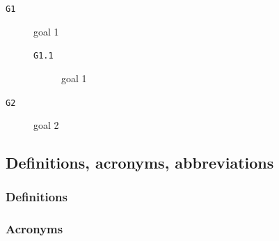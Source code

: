 \documentclass[12pt]{article}
\begin{document}

        \begin{description}
          \item [\texttt{G1}] goal 1
          \begin{description}
            \item [\texttt{G1.1}] goal 1
          \end{description}
          \item [\texttt{G2}] goal 2
        \end{description}

  \subsection{Definitions, acronyms, abbreviations}

    \subsubsection{Definitions}

      \begin{description}
        \item[]
      \end{description}

    \subsubsection{Acronyms}

      \begin{description}
        \item[]
      \end{description}
\end{document}
